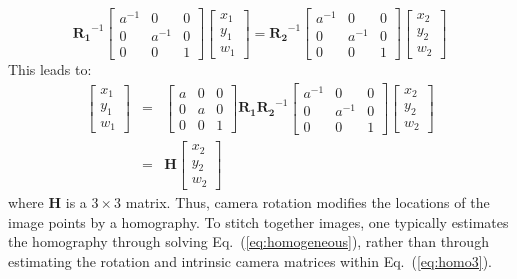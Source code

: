  \begin{equation}
 \mathbf{R_1}^{-1}
 \left [
    \begin{array}{ccc}
    a^{-1} & 0 & 0  \\
    0 & a^{-1} & 0  \\
    0 & 0 & 1 
    \end{array}
    \right ]
        \left [
    \begin{array}{c}
    x_1 \\
    y_1 \\
    w_1
    \end{array}
    \right ] 
=
 \mathbf{R_2}^{-1}
 \left [
    \begin{array}{ccc}
    a^{-1} & 0 & 0  \\
    0 & a^{-1} & 0  \\
    0 & 0 & 1 
    \end{array}
    \right ]
        \left [
    \begin{array}{c}
    x_2 \\
    y_2 \\
    w_2
    \end{array}
    \right ] 
    \label{eq:homo1}
\end{equation}   
This leads to:
 \begin{eqnarray}
        \left [
    \begin{array}{c}
    x_1 \\
    y_1 \\
    w_1
    \end{array}
    \right ] 
    & =  &
 \left [
    \begin{array}{ccc}
    a & 0 & 0  \\
    0 & a & 0  \\
    0 & 0 & 1 
    \end{array}
    \right ]
 \mathbf{R_1}
 \mathbf{R_2}^{-1}
 \left [
    \begin{array}{ccc}
    a^{-1} & 0 & 0  \\
    0 & a^{-1} & 0  \\
    0 & 0 & 1 
    \end{array}
    \right ]
        \left [
    \begin{array}{c}
    x_2 \\
    y_2 \\
    w_2
    \end{array}
    \right ] 
    \label{eq:homo2} \\
       & =  &
\mathbf{H}
        \left [
    \begin{array}{c}
    x_2 \\
    y_2 \\
    w_2
    \end{array}
    \right ] 
    \label{eq:homo3} 
\end{eqnarray}   
where $\mathbf{H}$ is a $3\times3$  matrix.  Thus, camera rotation modifies the locations of the image points by a homography. To stitch together images, one typically estimates the homography through solving Eq.~(\ref{eq:homogeneous}), rather than through estimating the rotation and intrinsic camera matrices within Eq.~(\ref{eq:homo3}).


